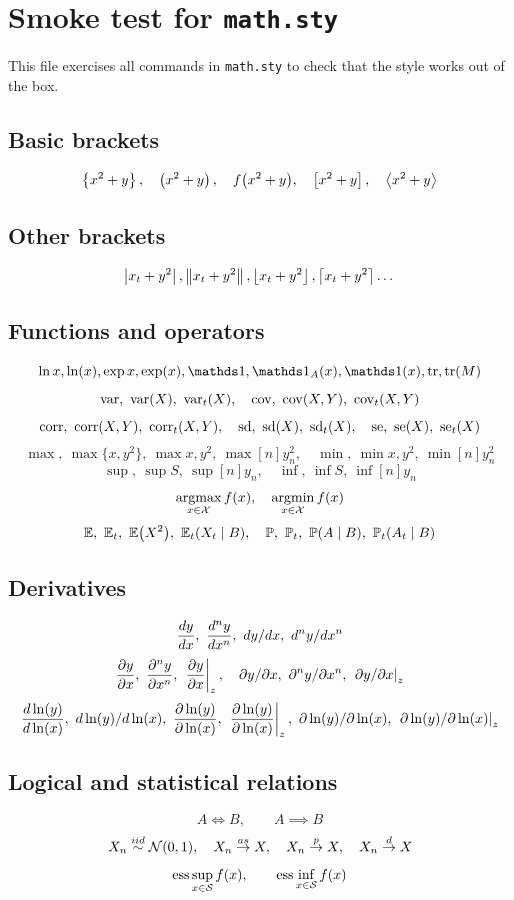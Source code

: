 \documentclass[11pt]{article}
\begin{document}
\section*{Smoke test for \texttt{math.sty}}

This file exercises all commands in \texttt{math.sty} to check that the style works out of the box.

\subsection*{Basic brackets}

\[
\left\lbrace x^2+y \right\rbrace,\quad
\left( x^2+y \right),\quad
f{\left( x^2+y \right)},\quad
\left[ x^2+y \right],\quad
\left\langle x^2+y \right\rangle
\]

\subsection*{Other brackets}

\[
\left\lvert x_t+y^2 \right\rvert, \left\lVert x_t+y^2 \right\rVert, \left\lfloor x_t+y^2 \right\rfloor, \left\lceil x_t+y^2 \right\rceil\dots
\]

\subsection*{Functions and operators}
\[
\ln x, \ln{x}, \exp x, \exp{x}, \ind, \ind[A](x), \ind{x}, \tr, \tr{M}
\]
\[
\var,\ \var{X},\ \var[t]{X},\quad
\cov,\ \cov{X,Y},\ \cov[t]{X,Y}
\]
\[
\corr,\ \corr{X,Y},\ \corr[t]{X,Y},\quad
\sd,\ \sd{X},\ \sd[t]{X},\quad
\se,\ \se{X},\ \se[t]{X}
\]
\[
\max,\ \max\{x,y^2\},\ \max{x,y^2},\ \max[n]{y^2_n},\quad
\min,\ \min{x,y^2},\ \min[n]{y^2_n}
\]
\[
\sup,\ \sup{S},\ \sup[n]{y_n},\quad
\inf,\ \inf{S},\ \inf[n]{y_n}
\]
\[
\operatorname*{argmax}_{x\in \mathcal{X}} f(x),\quad
\operatorname*{argmin}_{x\in \mathcal{X}} f(x)
\]
\[
\E,\ \E[t],\ \E{X^2},\ \E[t]{X_t\mid B},\quad
\P,\ \P[t],\ \P{A\mid B},\ \P[t]{A_t\mid B}
\]

\subsection*{Derivatives}
\[
\od{y}{x},\ \od[n]{y}{x},\ 
\odx{y}{x},\ \odx[n]{y}{x}
\]
\[
\pd{y}{x},\ \pd[n]{y}{x},\ \pd{y}{x}{z},\quad
\pdx{y}{x},\ \pdx[n]{y}{x},\ \pdx{y}{x}{z}
\]
\[
\oe{y}{x},\ \oex{y}{x},\ 
\pe{y}{x},\ \pe{y}{x}{z},\ 
\pex{y}{x},\ \pex{y}{x}{z}
\]

\subsection*{Logical and statistical relations}
\[
A \iff B,\qquad A \implies B
\]
\[
X_n \overset{iid}{\sim} \mathcal{N}(0,1),\quad
X_n \overset{as}{\to} X,\quad
X_n \overset{p}{\to} X,\quad
X_n \overset{d}{\to} X
\]
\[
\ess\sup_{x\in \Sc} f(x),\qquad
\ess\inf_{x\in \Sc} f(x)
\]
\end{document}
